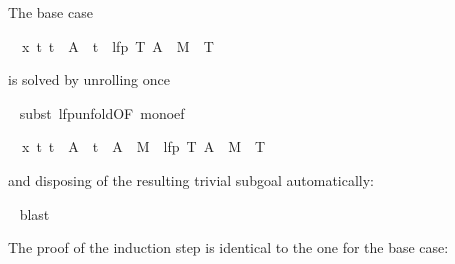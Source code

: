 \begin{isabellebody}
\begin{isamarkuptxt}%
\noindent
The base case
\begin{isabelle}%
\ {}{}\ {}x\ t{}\ t\ {}\ A\ {}\ t\ {}\ lfp\ {}{}T{}\ A\ {}\ M{}\ {}{}\ T{}%
\end{isabelle}
is solved by unrolling  once%
\end{isamarkuptxt}%
\isamarkuptrue%
\ \isamarkupfalse%
{}subst\ lfp{}unfold{}OF\ mono{}ef{}{}%
\begin{isamarkuptxt}%
\begin{isabelle}%
\ {}{}\ {}x\ t{}\ t\ {}\ A\ {}\ t\ {}\ A\ {}\ M{}\ {}{}\ lfp\ {}{}T{}\ A\ {}\ M{}\ {}{}\ T{}%
\end{isabelle}
and disposing of the resulting trivial subgoal automatically:%
\end{isamarkuptxt}%
\isamarkuptrue%
\ \isamarkupfalse%
{}blast{}%
\begin{isamarkuptxt}%
\noindent
The proof of the induction step is identical to the one for the base case:%

\end{isamarkuptxt}
\end{isabellebody}

